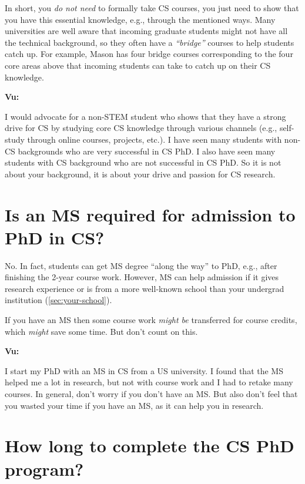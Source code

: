 \documentclass[oneside,11pt,dvipsnames]{book}
\newenvironment{commentbox}[1][]{
  \small
  \begin{mybox}
    {\small \textbf{#1}}
  }{
  \end{mybox}
}
\begin{document}
In short, you \emph{do not need} to formally take CS courses, you just need to show that you have this essential knowledge, e.g., through the mentioned ways. Many universities are well aware that incoming graduate students might not have all the technical background, so they often have a \emph{``bridge''} courses to help students catch up.  For example, Mason has four bridge courses corresponding to the four core areas above that incoming students can take to catch up on their CS knowledge.


\begin{commentbox}[Vu:]
  I would advocate for a non-STEM student who shows that they have a strong drive for CS by studying core CS knowledge through various channels (e.g., self-study through online courses, projects, etc.).  I have seen many students with non-CS backgrounds who are very successful in CS PhD.  I also have seen many students with CS background who are not successful in CS PhD.  So it is not about your background, it is about your drive and passion for CS research.
\end{commentbox}







\section{Is an MS required for admission to PhD in CS?}\label{sec:msrequirement}
No. In fact, students can get MS degree ``along the way'' to PhD, e.g., after finishing the 2-year course work.  However, MS can help admission if it gives research experience or is from a more well-known school than your undergrad institution (\autoref{sec:your-school}).

If you have an MS then some course work \emph{might be} transferred for course credits, which \emph{might} save some time. But don't count on this.

\begin{commentbox}[Vu:]
    I start my PhD with an MS in CS from a US university.  I found that the MS helped me a lot in research, but not with course work and I had to retake many courses.  In general, don't worry if you don't have an MS. But also don't feel that you wasted your time if you have an MS, as it can help you in research.
  \end{commentbox}


\section{How long to complete the CS PhD program?}\label{sec:time}
\end{document}

